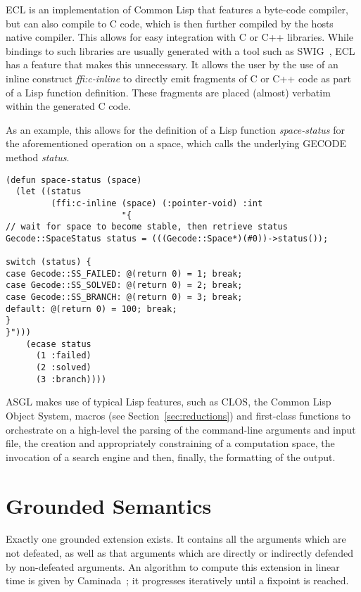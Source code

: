 \documentclass[runningheads,a4paper]{llncs}
\begin{document}
ECL is an implementation of Common Lisp that features a
byte-code compiler, but can also compile to C code, which is then
further compiled by the hosts native compiler. This allows for easy
integration with C or C++ libraries. While bindings to such libraries
are usually generated with a tool such as SWIG~\cite{swig}, ECL has a
feature that makes this unnecessary. It allows the user by the use of
an inline construct \textit{ffi:c-inline} to directly emit fragments of C
or C++ code as part of a Lisp function definition. These fragments are
placed (almost) verbatim within the generated C code.

As an example, this allows for the definition of a Lisp function
\textit{space-status} for the aforementioned operation on a space,
which calls the underlying GECODE method \textit{status}.

\begin{scriptsize}
\begin{verbatim}
(defun space-status (space)
  (let ((status
         (ffi:c-inline (space) (:pointer-void) :int
                       "{
// wait for space to become stable, then retrieve status
Gecode::SpaceStatus status = (((Gecode::Space*)(#0))->status());

switch (status) {
case Gecode::SS_FAILED: @(return 0) = 1; break;
case Gecode::SS_SOLVED: @(return 0) = 2; break;
case Gecode::SS_BRANCH: @(return 0) = 3; break;
default: @(return 0) = 100; break;
}
}")))
    (ecase status
      (1 :failed)
      (2 :solved)
      (3 :branch))))
\end{verbatim}
\end{scriptsize}

ASGL makes use of typical Lisp features, such as CLOS, the Common Lisp
Object System, macros (see Section~\ref{sec:reductions}) and
first-class functions to orchestrate on a high-level the parsing of
the command-line arguments and input file, the creation and
appropriately constraining of a computation space, the invocation of a
search engine and then, finally, the formatting of the output.

\section{Grounded Semantics}\label{sec:grounded}

Exactly one grounded extension exists. It contains all the arguments
which are not defeated, as well as that arguments which are directly
or indirectly defended by non-defeated arguments. An algorithm to
compute this extension in linear time is given by
Caminada~\cite{Modgil2009}; it progresses iteratively until a fixpoint
is reached.
\end{document}
